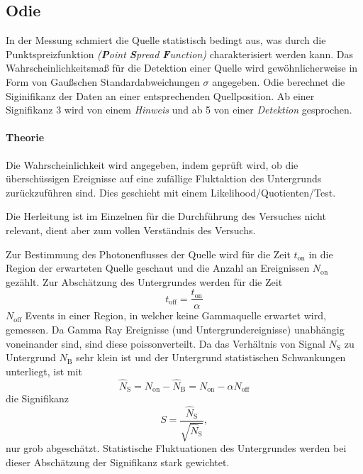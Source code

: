 \subsection{Odie}%
\label{sub:odie}
In der Messung schmiert die Quelle statistisch bedingt aus, 
was durch die Punktspreizfunktion \textit{(\textbf{P}oint \textbf{S}pread 
\textbf{F}unction)} charakterisiert werden kann.
Das Wahrscheinlichkeitsmaß für die Detektion einer Quelle wird 
gewöhnlicherweise in Form von Gaußschen Standardabweichungen $\sigma$ 
angegeben.
Odie berechnet die Siginifikanz der Daten an einer entsprechenden Quellposition.
Ab einer Signifikanz \SI{3}{\sigma} wird von einem \textit{Hinweis}
und ab \SI{5}{\sigma} von einer \textit{Detektion} gesprochen.

\paragraph{Theorie}%

Die Wahrscheinlichkeit wird angegeben, indem geprüft wird,
ob die über\-schüssigen Ereignisse auf eine zufällige
Fluktaktion des Untergrunds zurück\-zu\-führen sind.
Dies geschieht mit einem Likelihood\-/Quotienten\-/Test.

Die Herleitung ist im Einzelnen für die Durchführung des
Versuches nicht relevant,
dient aber zum vollen Verständnis des Versuchs.

Zur Bestimmung des Photonenflusses der Quelle wird für die Zeit $t_\text{on}$ in die Region der
erwarteten Quelle geschaut und die Anzahl an Ereignissen $N_\text{on}$ gezählt.
Zur Abschätzung des Untergrundes werden für die Zeit
\begin{equation*}
    t_\text{off} = \frac{t_\text{on}}{\alpha}
\end{equation*}
$N_\text{off}$
Events in einer Region,
in welcher keine Gammaquelle erwartet wird,
gemessen.
Da Gamma Ray Ereignisse (und Untergrundereignisse)
unabhängig voneinander sind,
sind diese poissonverteilt.
Da das Verhältnis von Signal $N_\text{S}$ zu Untergrund
$N_\text{B}$ sehr klein ist
und der Untergrund statistischen Schwankungen unterliegt,
ist mit
\begin{equation}
	\hat{N}_\text{S} = N_\text{on} - \hat{N}_\text{B} = N_\text{on} - \alpha N_\text{off}
\end{equation}
die Signifikanz
\begin{equation}
	S = \frac{\hat{N}_\text{S}}{\sqrt{\hat{N}_\text{S}}},
\end{equation}
nur grob abgeschätzt.
Statistische Fluktuationen des Untergrundes werden bei dieser Abschätzung der
Signifikanz stark gewichtet.

